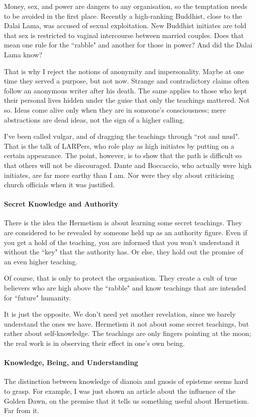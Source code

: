 Money, sex, and power are dangers to any organisation, so the temptation needs to be avoided in the first place.
Recently a high-ranking Buddhist, close to the Dalai Lama, was accused of sexual exploitation. New Buddhist initiates
are told that sex is restricted to vaginal intercourse between married couples. Does that mean one rule for the
``rabble" and another for those in power? And did the Dalai Lama know?

That is why I reject the notions of anonymity and impersonality. Maybe at one time they served a purpose, but not now.
Strange and contradictory claims often follow an anonymous writer after his death. The same applies to those who kept
their personal lives hidden under the guise that only the teachings mattered. Not so. Ideas come alive only when they
are in someone's consciousness; mere abstractions are dead ideas, not the sign of a higher
calling.

I've been called vulgar, and of dragging the teachings through ``rot and mud". That is the talk of
LARPers, who role play as high initiates by putting on a certain appearance. The point, however, is to show that the
path is difficult so that others will not be discouraged. Dante and Boccaccio, who actually were high initiates, are
far more earthy than I am. Nor were they shy about criticising church officials when it was justified.

\paragraph{Secret Knowledge and Authority}
There is the idea the Hermetism is about learning some secret teachings. They are considered to be revealed by someone
held up as an authority figure. Even if you get a hold of the teaching, you are informed that you
won't understand it without the ``key" that the authority has. Or else, they hold out the promise
of an even higher teaching.

Of course, that is only to protect the organisation. They create a cult of true believers who are high above the
``rabble" and know teachings that are intended for ``future" humanity.

It is just the opposite. We don't need yet another revelation, since we barely understand the ones
we have. Hermetism it not about some secret teachings, but rather about self-knowledge. The teachings are only fingers
pointing at the moon; the real work is in observing their effect in one's own being.

\paragraph{Knowledge, Being, and Understanding}
The distinction between knowledge of dianoia and gnosis of episteme seems hard to grasp. For example, I was just shown
an article about the influence of the Golden Dawn, on the premise that it tells us something useful about Hermetism.
Far from it.

